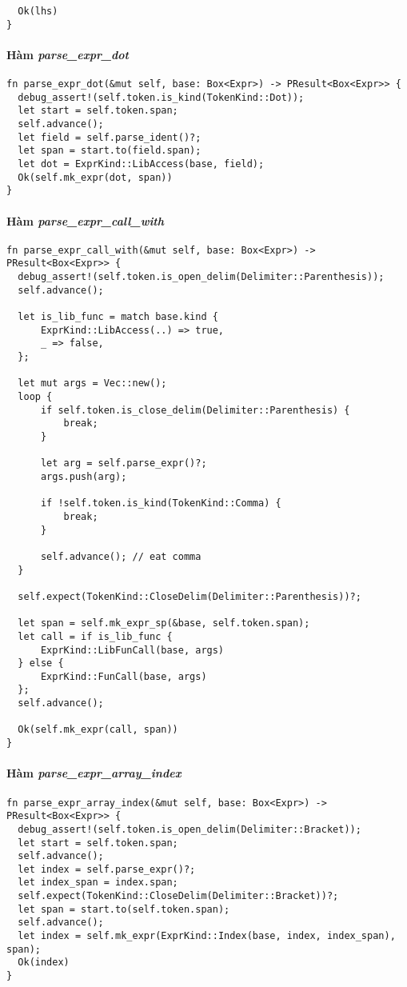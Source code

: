{\begin{lstlisting}
  Ok(lhs)
}
\end{lstlisting}

\paragraph{Hàm \textit{parse\_expr\_dot}}
\label{ap1:expr_dot}
\begin{lstlisting}
fn parse_expr_dot(&mut self, base: Box<Expr>) -> PResult<Box<Expr>> {
  debug_assert!(self.token.is_kind(TokenKind::Dot));
  let start = self.token.span;
  self.advance();
  let field = self.parse_ident()?;
  let span = start.to(field.span);
  let dot = ExprKind::LibAccess(base, field);
  Ok(self.mk_expr(dot, span))
}
\end{lstlisting}

\paragraph{Hàm \textit{parse\_expr\_call\_with}}
\label{ap1:expr_call_with}
\begin{lstlisting}
fn parse_expr_call_with(&mut self, base: Box<Expr>) -> PResult<Box<Expr>> {
  debug_assert!(self.token.is_open_delim(Delimiter::Parenthesis));
  self.advance();

  let is_lib_func = match base.kind {
      ExprKind::LibAccess(..) => true,
      _ => false,
  };

  let mut args = Vec::new();
  loop {
      if self.token.is_close_delim(Delimiter::Parenthesis) {
          break;
      }

      let arg = self.parse_expr()?;
      args.push(arg);

      if !self.token.is_kind(TokenKind::Comma) {
          break;
      }

      self.advance(); // eat comma
  }

  self.expect(TokenKind::CloseDelim(Delimiter::Parenthesis))?;

  let span = self.mk_expr_sp(&base, self.token.span);
  let call = if is_lib_func {
      ExprKind::LibFunCall(base, args)
  } else {
      ExprKind::FunCall(base, args)
  };
  self.advance();

  Ok(self.mk_expr(call, span))
}
\end{lstlisting}

\paragraph{Hàm \textit{parse\_expr\_array\_index}}
\label{ap1:expr_array_index}
\begin{lstlisting}
fn parse_expr_array_index(&mut self, base: Box<Expr>) -> PResult<Box<Expr>> {
  debug_assert!(self.token.is_open_delim(Delimiter::Bracket));
  let start = self.token.span;
  self.advance();
  let index = self.parse_expr()?;
  let index_span = index.span;
  self.expect(TokenKind::CloseDelim(Delimiter::Bracket))?;
  let span = start.to(self.token.span);
  self.advance();
  let index = self.mk_expr(ExprKind::Index(base, index, index_span), span);
  Ok(index)
}
\end{lstlisting}
}